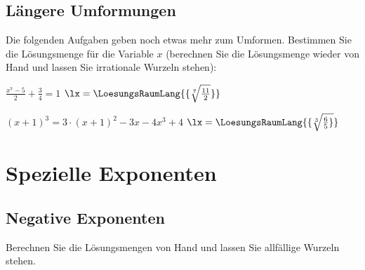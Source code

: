 \subsection{Längere Umformungen}

Die folgenden Aufgaben geben noch etwas mehr zum Umformen. Bestimmen
Sie die Lösungsmenge für die Variable $x$ (berechnen Sie die
Lösungsmenge wieder von Hand und lassen Sie irrationale Wurzeln stehen):

\begin{bbwAufgabenBlock}
\item
 $\frac{x^7-5}{2} + \frac34 = 1$ \hspace{10mm} $\lx=\LoesungsRaumLang{\{\sqrt[7]{\frac{11}2}\}}$

\item
 $(x+1)^3 = 3\cdot{}(x+1)^2 - 3x - 4x^3 + 4$ \hspace{10mm} $\lx=\LoesungsRaumLang{\{\sqrt[3]{\frac65\}}}$

\end{bbwAufgabenBlock}
\newpage

\section{Spezielle Exponenten}
\subsection{Negative Exponenten}

Berechnen Sie die Lösungsmengen von Hand und lassen Sie allfällige
Wurzeln stehen.

